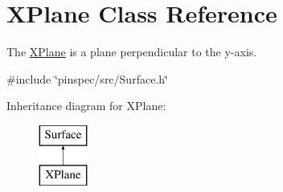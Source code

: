 \hypertarget{classXPlane}{\section{X\-Plane Class Reference}
\label{classXPlane}
}


The \hyperlink{classXPlane}{X\-Plane} is a plane perpendicular to the y-\/axis.  




{\ttfamily \#include \char`\"{}pinspec/src/\-Surface.\-h\char`\"{}}

Inheritance diagram for X\-Plane\-:\begin{figure}[H]
\begin{center}
\leavevmode
\includegraphics[height=2.000000cm]{classXPlane}
\end{center}
\end{figure}
